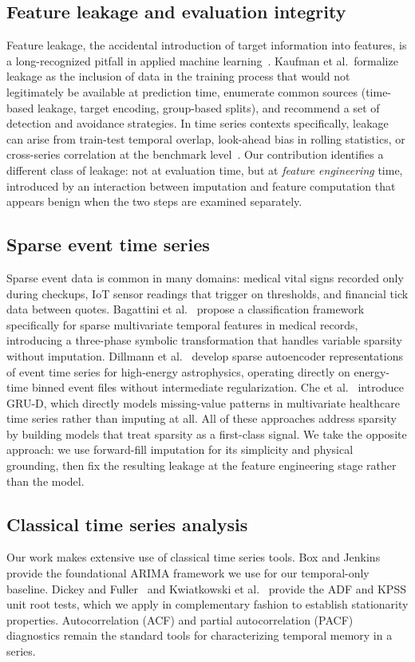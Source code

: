 \subsection{Feature leakage and evaluation integrity}

Feature leakage, the accidental introduction of target information into
features, is a long-recognized pitfall in applied machine
learning~\cite{kaufman2012leakage}. Kaufman et al.\ formalize leakage as
the inclusion of data in the training process that would not legitimately
be available at prediction time, enumerate common sources (time-based
leakage, target encoding, group-based splits), and recommend a set of
detection and avoidance strategies. In time series contexts specifically,
leakage can arise from train-test temporal overlap, look-ahead bias in
rolling statistics, or cross-series correlation at the benchmark
level~\cite{meyer2025benchmarking}. Our contribution identifies a
different class of leakage: not at evaluation time, but at \emph{feature
engineering} time, introduced by an interaction between imputation and
feature computation that appears benign when the two steps are examined
separately.

\subsection{Sparse event time series}

Sparse event data is common in many domains: medical vital signs recorded
only during checkups, IoT sensor readings that trigger on thresholds, and
financial tick data between quotes. Bagattini et
al.~\cite{bagattini2019sparse} propose a classification framework
specifically for sparse multivariate temporal features in medical records,
introducing a three-phase symbolic transformation that handles variable
sparsity without imputation. Dillmann et al.~\cite{dillmann2024events}
develop sparse autoencoder representations of event time series for
high-energy astrophysics, operating directly on energy-time binned event
files without intermediate regularization. Che et
al.~\cite{che2018grud} introduce GRU-D, which directly models
missing-value patterns in multivariate healthcare time series rather than
imputing at all. All of these approaches address sparsity by building
models that treat sparsity as a first-class signal. We take the opposite
approach: we use forward-fill imputation for its simplicity and physical
grounding, then fix the resulting leakage at the feature engineering
stage rather than the model.

\subsection{Classical time series analysis}

Our work makes extensive use of classical time series tools. Box and
Jenkins~\cite{box1976timeseries} provide the foundational ARIMA framework
we use for our temporal-only baseline. Dickey and
Fuller~\cite{dickey1979unit} and Kwiatkowski et
al.~\cite{kwiatkowski1992kpss} provide the ADF and KPSS unit root tests,
which we apply in complementary fashion to establish stationarity
properties. Autocorrelation (ACF) and partial autocorrelation (PACF)
diagnostics remain the standard tools for characterizing temporal memory
in a series.
